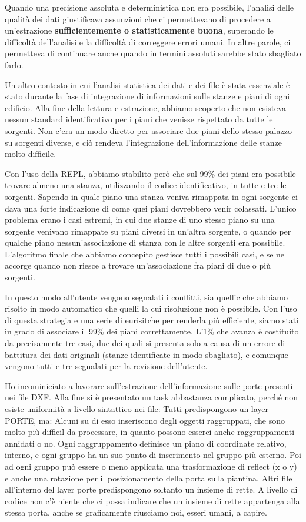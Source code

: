 \documentclass[12pt]{report}
\begin{document}
Quando una precisione assoluta e deterministica non era possibile, l'analisi delle qualità dei dati giustificava assunzioni che ci permettevano di procedere a un'estrazione \textbf{sufficientemente o statisticamente buona}, superando le difficoltà dell'analisi e la difficoltà di correggere errori umani. In altre parole, ci permetteva di continuare anche quando in termini assoluti sarebbe stato sbagliato farlo.

Un altro contesto in cui l'analisi statistica dei dati e dei file è stata essenziale è stato durante la fase di integrazione di informazioni sulle stanze e piani di ogni edificio. Alla fine della lettura e estrazione, abbiamo scoperto che non esisteva nessun standard identificativo per i piani che venisse rispettato da tutte le sorgenti. Non c'era un modo diretto per associare due piani dello stesso palazzo su sorgenti diverse, e ciò rendeva l'integrazione dell'informazione delle stanze molto difficile.

Con l'uso della REPL, abbiamo stabilito però che sul 99\% dei piani era possibile trovare almeno una stanza, utilizzando il codice identificativo, in tutte e tre le sorgenti. Sapendo in quale piano una stanza veniva rimappata in ogni sorgente ci dava una forte indicazione di come quei piani dovrebbero venir colassati. L'unico problema erano i casi estremi, in cui due stanze di uno stesso piano su una sorgente venivano rimappate su piani diversi in un'altra sorgente, o quando per qualche piano nessun'associazione di stanza con le altre sorgenti era possibile. L'algoritmo finale che abbiamo concepito gestisce tutti i possibili casi, e se ne accorge quando non riesce a trovare un'associazione fra piani di due o più sorgenti. 

In questo modo all'utente vengono segnalati i conflitti, sia quellic che abbiamo risolto in modo automatico che quelli la cui risoluzione non è possibile. Con l'uso di questa strategia e una serie di eurisitche per renderla più efficiente, siamo stati in grado di associare il 99\% dei piani correttamente. L'1\% che avanza è costituito da precisamente tre casi, due dei quali si presenta solo a causa di un errore di battitura dei dati originali (stanze identificate in modo sbagliato), e comunque vengono tutti e tre segnalati per la revisione dell'utente. 

Ho incominiciato a lavorare sull’estrazione dell’informazione sulle porte presenti nei file DXF. Alla fine si è presentato un task abbastanza complicato, perché non esiste uniformità a livello sintattico nei file:
Tutti predispongono un layer PORTE, ma:
Alcuni su di esso inseriscono degli oggetti raggruppati, che sono molto più difficil da processare, in quanto possono esserci anche raggruppamenti annidati o no. Ogni raggruppamento definisce un piano di coordinate relativo, interno, e ogni gruppo ha un suo punto di inserimento nel gruppo più esterno. Poi ad ogni gruppo può essere o meno applicata una trasformazione di reflect (x o y) e anche una rotazione per il posizionamento della porta sulla piantina.
Altri file all’interno del layer porte predispongono soltanto un insieme di rette. A livello di codice non c’è niente che ci possa indicare che un insieme di rette appartenga alla stessa porta, anche se graficamente riusciamo noi, esseri umani, a capire.
\end{document}
